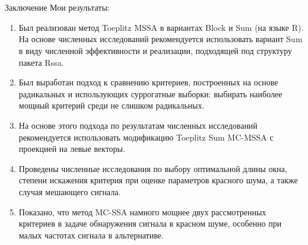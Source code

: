 \documentclass[pdf,notheorems,10pt,intlimits,unicode]{beamer}
\begin{document}
\section{}
\begin{frame}{Заключение}
  Мои результаты:
	\begin{enumerate}
		\item Был реализован метод Toeplitz MSSA в вариантах Block и Sum (на языке \textsf{R}). На основе численных исследований рекомендуется использовать вариант Sum в виду численной эффективности и реализации, подходящей под структуру пакета \textsf{Rssa}.
		\item Был выработан подход к сравнению критериев, построенных на основе радикальных и использующих суррогатные выборки: выбирать наиболее мощный критерий среди не слишком радикальных.
		\item На основе этого подхода по результатам численных исследований рекомендуется использовать модификацию Toeplitz Sum MC-MSSA с проекцией на левые векторы.
    \item Проведены численные исследования по выбору оптимальной длины окна, степени искажения критерия при оценке параметров красного шума, а также случая мешающего сигнала.
    \item Показано, что метод MC-SSA намного мощнее двух рассмотренных критериев в задаче обнаружения сигнала в красном шуме, особенно при малых частотах сигнала в альтернативе.
  \end{enumerate}
\end{frame}
\end{document}
